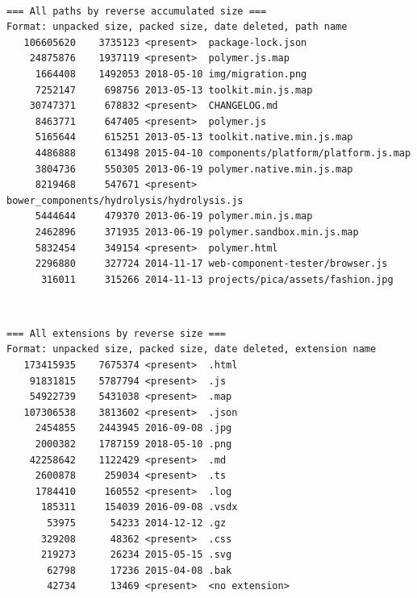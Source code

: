 \documentclass[compress,t,aspectratio=169]{beamer}
\begin{document}

\begin{frame}[containsverbatim]

   \\
  {\small
  \begin{verbatim}
=== All paths by reverse accumulated size ===
Format: unpacked size, packed size, date deleted, path name
   106605620    3735123 <present>  package-lock.json
    24875876    1937119 <present>  polymer.js.map
     1664408    1492053 2018-05-10 img/migration.png
     7252147     698756 2013-05-13 toolkit.min.js.map
    30747371     678832 <present>  CHANGELOG.md
     8463771     647405 <present>  polymer.js
     5165644     615251 2013-05-13 toolkit.native.min.js.map
     4486888     613498 2015-04-10 components/platform/platform.js.map
     3804736     550305 2013-06-19 polymer.native.min.js.map
     8219468     547671 <present>  bower_components/hydrolysis/hydrolysis.js
     5444644     479370 2013-06-19 polymer.min.js.map
     2462896     371935 2013-06-19 polymer.sandbox.min.js.map
     5832454     349154 <present>  polymer.html
     2296880     327724 2014-11-17 web-component-tester/browser.js
      316011     315266 2014-11-13 projects/pica/assets/fashion.jpg
  \end{verbatim}
  }

\end{frame}


\begin{frame}[containsverbatim]

   \\
  {\small
  \begin{verbatim}
=== All extensions by reverse size ===
Format: unpacked size, packed size, date deleted, extension name
   173415935    7675374 <present>  .html
    91831815    5787794 <present>  .js
    54922739    5431038 <present>  .map
   107306538    3813602 <present>  .json
     2454855    2443945 2016-09-08 .jpg
     2000382    1787159 2018-05-10 .png
    42258642    1122429 <present>  .md
     2600878     259034 <present>  .ts
     1784410     160552 <present>  .log
      185311     154039 2016-09-08 .vsdx
       53975      54233 2014-12-12 .gz
      329208      48362 <present>  .css
      219273      26234 2015-05-15 .svg
       62798      17236 2015-04-08 .bak
       42734      13469 <present>  <no extension>
  \end{verbatim}
  }

\end{frame}
\end{document}
